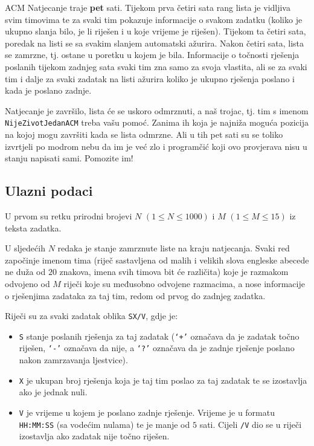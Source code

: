 \begin{statement}[
  problempoints=50,
  timelimit=1 sekunda,
  memorylimit=512 MiB,
]{ACM}
Natjecanje traje \textbf{pet} sati. Tijekom prva četiri sata rang lista je
vidljiva svim timovima te za svaki tim pokazuje informacije o svakom zadatku
(koliko je ukupno slanja bilo, je li riješen i u koje vrijeme je riješen).
Tijekom ta četiri sata, poredak na listi se sa svakim slanjem automatski
ažurira.  Nakon četiri sata, lista se zamrzne, tj. ostane u poretku u kojem
je bila.  Informacije o točnosti rješenja poslanih tijekom zadnjeg sata svaki
tim zna samo za svoja vlastita, ali se za svaki tim i dalje za svaki zadatak
na listi ažurira koliko je ukupno rješenja poslano i kada je poslano zadnje.

Natjecanje je završilo, lista će se uskoro odmrznuti, a naš trojac, tj. tim s
imenom \texttt{NijeZivotJedanACM} treba vašu pomoć. Zanima ih koja je najniža
moguća pozicija na kojoj mogu završiti kada se lista odmrzne. Ali u tih pet
sati su se toliko izvrtjeli po modrom nebu da im je već zlo i programčić koji
ovo provjerava nisu u stanju napisati sami. Pomozite im!

\subsection*{Ulazni podaci}
U prvom su retku prirodni brojevi $N$ $(1 \le N \le 1000)$ i $M$ $(1 \le M \le 15)$
iz teksta zadatka.

U sljedećih $N$ redaka je stanje zamrznute liste na kraju natjecanja. Svaki red
započinje imenom tima (riječ sastavljena od malih i velikih slova engleske
abecede ne duža od $20$ znakova, imena svih timova bit će različita) koje je
razmakom odvojeno od $M$ riječi koje su međusobno odvojene razmacima, a nose
informacije o rješenjima zadataka za taj tim, redom od prvog do zadnjeg
zadatka.

Riječi su za svaki zadatak oblika \texttt{SX/V}, gdje je:
\begin{itemize}[topsep=0pt]
  \item \texttt{S} stanje poslanih rješenja za taj zadatak (\texttt{‘+’}
    označava da je zadatak točno riješen, \texttt{‘-’} označava da nije, a
    \texttt{‘?’} označava da je zadnje rješenje poslano nakon zamrzavanja
    ljestvice).
  \item \texttt{X} je ukupan broj rješenja koja je taj tim poslao za taj zadatak
    te se izostavlja ako je jednak nuli.
  \item \texttt{V} je vrijeme u kojem je poslano zadnje rješenje. Vrijeme je u
    formatu \texttt{HH:MM:SS} (sa vodećim nulama) te je manje od $5$ sati.
    Cijeli \texttt{/V} dio se u riječi izostavlja ako zadatak nije točno
    riješen.
\end{itemize}


\end{statement}
